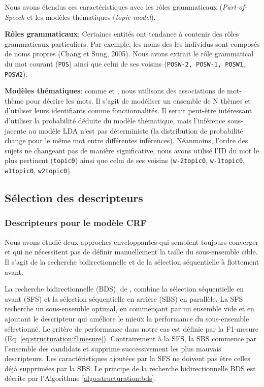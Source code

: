 Nous avons étendus ces caractéristiques avec les rôles grammaticaux (\textit{Part-of-Speech} et les modèles thématiques (\textit{topic model}).

\textbf{Rôles grammaticaux}: Certaines entités ont tendance à contenir des rôles grammaticaux particuliers. Par exemple, les noms des
les individus sont composés de noms propres (Chang et Sung, 2005). Nous avons extrait le rôle grammatical du mot courant (\verb|POS|) ainsi que celui de ses voisins (\verb|POSW-2, POSW-1, POSW1, POSW2|).

\textbf{Modèles thématiques}: comme \citet{polifroni2011usingLDA} et \citet{nallapati2010blinddomaintransferner}, nous utilisons des associations de mot-thème pour décrire les mots. Il s'agit de modéliser un ensemble de N thèmes et d'utiliser leurs identifiants comme fonctionnalités. Il serait peut-être intéressant d'utiliser la probabilité déduite du modèle thématique, mais l'inférence sous-jacente au modèle LDA \citep{blei2003lda} n'est pas déterministe (la distribution de probabilité change pour le même mot entre différentes inférences).
Néanmoins, l'ordre des sujets ne changeant pas de manière significative, nous avons utilisé l'ID du mot le plus pertinent (\verb|topic0|) ainsi que celui de ses voisins (\verb|w-2topic0|, \verb|w-1topic0|, \verb|w1topic0|, \verb|w2topic0|).

\subsection{Sélection des descripteurs}
\subsubsection{Descripteurs pour le modèle CRF}
 Nous avons étudié deux approches enveloppantes qui semblent toujours converger et qui ne nécessitent pas de définir manuellement la taille du sous-ensemble cible. Il s'agit de la recherche bidirectionnelle et de la  sélection séquentielle à flottement avant.

La recherche bidirectionnelle (BDS), de \citet{liu2012featureSelection}, combine la sélection séquentielle en avant (SFS) et la sélection séquentielle en arrière (SBS) en parallèle. La SFS recherche un sous-ensemble optimal, en commençant par un ensemble vide et en ajoutant le descripteur qui améliore le mieux la performance du sous-ensemble sélectionné. Le critère de performance dans notre cas est définie par la F1-mesure (Eq. \ref{eq:structuration:f1mesure}). Contrairement à la SFS, la SBS commence par l'ensemble des candidats et supprime successivement les plus mauvais descripteurs. Les caractéristiques ajoutées par la SFS ne doivent pas être celles déjà supprimées par la SBS. Le principe de la recherche bidirectionnelle BDS est décrite par l'Algorithme \ref{algo:structuration:bds}.


